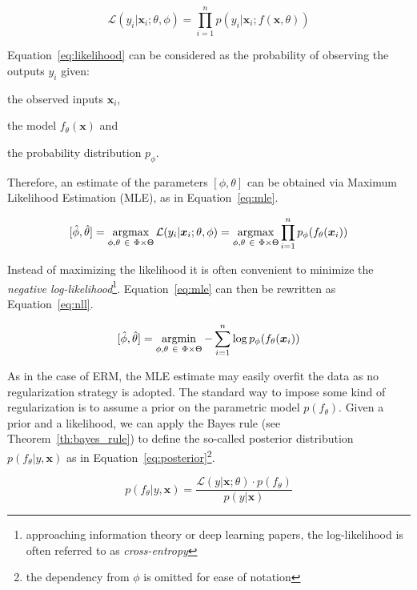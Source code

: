 \begin{equation} \label{eq:likelihood}
	\mathcal{L}(y_i|\bm{x}_i; \theta, \phi) = \prod_{i=1}^{n} p(y_i | \bm{x}_i ; f(\bm{x}, \theta))
\end{equation}

Equation~\eqref{eq:likelihood} can be considered as the probability of observing the outputs $y_i$ given:
\begin{enumerate*}[label=(\roman*)]
	\item the observed inputs $\bm{x}_i$,
	\item the model $f_\theta(\bm{x})$ and
	\item the probability distribution $p_\phi$.
\end{enumerate*}
Therefore, an estimate of the parameters $[\phi, \theta]$ can be obtained via Maximum Likelihood Estimation (MLE), as in Equation~\eqref{eq:mle}.

\begin{equation} \label{eq:mle}
	[\hat \phi, \hat \theta] =\mathop{\mathrm{argmax}}\limits_{\phi, \theta~\in~\Phi \times \Theta}\mathcal{L}(y_i|\bm{x}_i; \theta, \phi) = \mathop{\mathrm{argmax}}\limits_{\phi, \theta~\in~\Phi \times \Theta} \prod_{i=1}^{n} p_\phi(f_\theta(\bm{x}_i))
\end{equation}

Instead of maximizing the likelihood it is often convenient to minimize the \textit{negative log-likelihood}\footnote{approaching information theory or deep learning papers, the log-likelihood is often referred to as \textit{cross-entropy}}. Equation~\eqref{eq:mle} can then be rewritten as Equation~\eqref{eq:nll}.

\begin{equation} \label{eq:nll}
	[\hat \phi, \hat \theta] =\mathop{\mathrm{argmin}}\limits_{\phi, \theta~\in~\Phi \times \Theta} - \sum_{i=1}^n \log p_\phi(f_\theta(\bm{x}_i))
\end{equation}

As in the case of ERM, the MLE estimate may easily overfit the data as no regularization strategy is adopted. The standard way to impose some kind of regularization is to assume a prior on the parametric model $p(f_\theta)$. Given a prior and a likelihood, we can apply the Bayes rule (see Theorem~\ref{th:bayes_rule}) to define the so-called posterior distribution $p(f_\theta | y, \bm{x})$ as in Equation~\eqref{eq:posterior}\footnote{the dependency from $\phi$ is omitted for ease of notation}.

\begin{equation} \label{eq:posterior}
	p(f_\theta | y, \bm{x}) = \frac{\mathcal{L}(y|\bm{x}; \theta) \cdot p(f_\theta)}{p(y|\bm{x})}
\end{equation}

